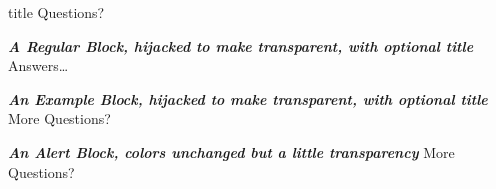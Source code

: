 \documentclass[aspectratio=1610]{beamer}
\begin{document}
\begin{NCARprettyframe}
  \vspace{3em}
  \begin{beamercolorbox}[sep=8pt,center]{title}
    \Huge{\textcolor{HilightGreen}{Questions?}}
  \end{beamercolorbox}
  \begin{block}{\emph{\textbf{A Regular Block, hijacked to make transparent, with optional title}}}
    \centering
    \Huge{Answers\ldots}
  \end{block}
  \begin{exampleblock}{\emph{\textbf{An Example Block, hijacked to make transparent, with optional title}}}
    \centering
    \Huge{More Questions?}
  \end{exampleblock}
  \begin{alertblock}{\emph{\textbf{An Alert Block, colors unchanged but a little transparency}}}
    \centering
    \Huge{More Questions?}
  \end{alertblock}
\end{NCARprettyframe}
\end{document}
